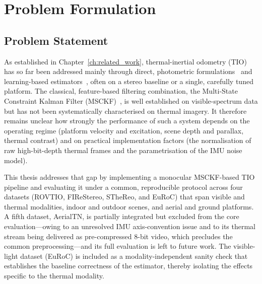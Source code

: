 \chapter{Problem Formulation}
\label{ch:problem_formulation}

\section{Problem Statement}
\label{sec:problem}

As established in Chapter~\ref{ch:related_work}, thermal-inertial odometry (TIO) has so far been addressed mainly through direct, photometric formulations~\cite{Khattak_2019} and learning-based estimators~\cite{Saputra_2020}, often on a stereo baseline or a single, carefully tuned platform. The classical, feature-based filtering combination, the Multi-State Constraint Kalman Filter (MSCKF)~\cite{Mourikis_2007}, is well established on visible-spectrum data but has not been systematically characterised on thermal imagery. It therefore remains unclear how strongly the performance of such a system depends on the operating regime (platform velocity and excitation, scene depth and parallax, thermal contrast) and on practical implementation factors (the normalisation of raw high-bit-depth thermal frames and the parametrisation of the IMU noise model).

This thesis addresses that gap by implementing a monocular MSCKF-based TIO pipeline and evaluating it under a common, reproducible protocol across four datasets (ROVTIO, FIReStereo, STheReo, and EuRoC) that span visible and thermal modalities, indoor and outdoor scenes, and aerial and ground platforms. A fifth dataset, AerialTN, is partially integrated but excluded from the core evaluation---owing to an unresolved IMU axis-convention issue and to its thermal stream being delivered as pre-compressed $8$-bit video, which precludes the common preprocessing---and its full evaluation is left to future work. The visible-light dataset (EuRoC) is included as a modality-independent sanity check that establishes the baseline correctness of the estimator, thereby isolating the effects specific to the thermal modality.

